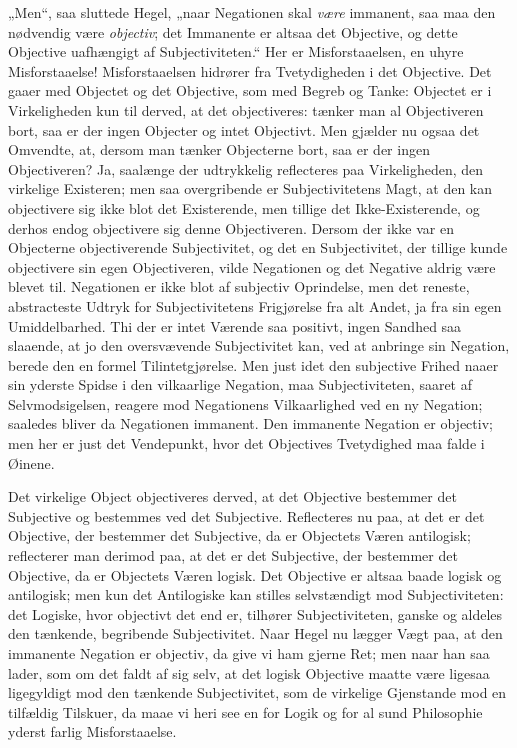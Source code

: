 \documentclass[11pt]{book}
\newcommand{\opage}[1]{\marginnote{\footnotesize\textit{[#1]}}}
\begin{document}
„Men“, saa sluttede Hegel, „naar Negationen skal \emph{være}
immanent, saa maa den nødvendig være \emph{objectiv}; det Immanente er
altsaa det Objective, og dette Objective uafhængigt af
Subjectiviteten.“ Her er Misforstaaelsen, en uhyre Misforstaaelse!
Misforstaaelsen hidrører fra Tvetydigheden i det Objective. Det gaaer
med Objectet og det Objective, som med Begreb og Tanke: Objectet er i
Virkeligheden kun til derved, at det objectiveres: tænker man al
Objectiveren bort, saa er der ingen Objecter og intet Objectivt. Men
gjælder nu ogsaa det Omvendte, at, dersom man tænker Objecterne bort,
saa er der ingen Objectiveren? Ja, saalænge der udtrykkelig
reflecteres paa Virkeligheden, den virkelige Existeren; men saa
overgribende er Subjectivitetens Magt, at den kan objectivere sig ikke
blot det Existerende, men tillige det Ikke-Existerende, og derhos
endog objectivere sig denne Objectiveren. Dersom der ikke var en
Objecterne objectiverende Subjectivitet, og det en Subjectivitet, der
tillige kunde objectivere sin egen Objectiveren, vilde Negationen og
det Negative aldrig være blevet til. Negationen er ikke blot af
subjectiv Oprindelse, men det reneste, abstracteste Udtryk for
Subjectivitetens Frigjørelse fra alt Andet, ja fra sin egen
Umiddelbarhed. Thi der er intet Værende saa positivt, ingen Sandhed
saa slaaende, at jo den oversvævende Subjectivitet kan, ved at
anbringe sin Negation, berede den en formel Tilintetgjørelse. Men just
idet den subjective Frihed naaer sin yderste Spidse i den
\opage{149} \setcounter{footnote}{0}%
vilkaarlige Negation, maa Subjectiviteten, saaret af Selvmodsigelsen,
reagere mod Negationens Vilkaarlighed ved en ny Negation; saaledes
bliver da Negationen immanent. Den immanente Negation er objectiv; men
her er just det Vendepunkt, hvor det Objectives Tvetydighed maa falde
i Øinene.

Det virkelige Object objectiveres derved, at det Objective bestemmer
det Subjective og bestemmes ved det Subjective. Reflecteres nu paa, at
det er det Objective, der bestemmer det Subjective, da er Objectets
Væren antilogisk; reflecterer man derimod paa, at det er det
Subjective, der bestemmer det Objective, da er Objectets Væren logisk.
Det Objective er altsaa baade logisk og antilogisk; men kun det
Antilogiske kan stilles selvstændigt mod Subjectiviteten: det Logiske,
hvor objectivt det end er, tilhører Subjectiviteten, ganske og aldeles
den tænkende, begribende Subjectivitet. Naar Hegel nu lægger Vægt paa,
at den immanente Negation er objectiv, da give vi ham gjerne Ret; men
naar han saa lader, som om det faldt af sig selv, at det logisk
Objective maatte være ligesaa ligegyldigt mod den tænkende
Subjectivitet, som de virkelige Gjenstande mod en tilfældig Tilskuer,
da maae vi heri see en for Logik og for al sund Philosophie yderst
farlig Misforstaaelse.
\end{document}
